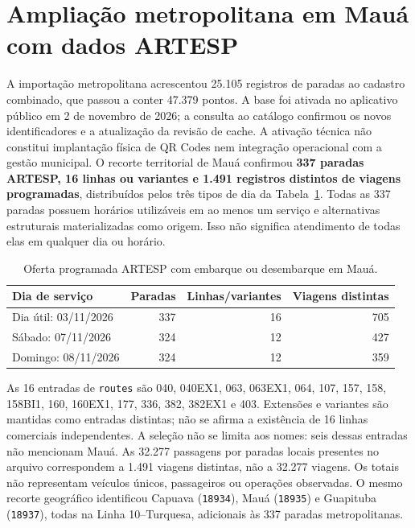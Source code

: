 \section{Ampliação metropolitana em Mauá com dados ARTESP}
\label{sec:artesp-maua}
A importação metropolitana acrescentou 25.105 registros de paradas ao cadastro combinado, que passou a conter 47.379 pontos. A base foi ativada no aplicativo público em 2 de novembro de 2026; a consulta ao catálogo confirmou os novos identificadores e a atualização da revisão de cache. A ativação técnica não constitui implantação física de QR Codes nem integração operacional com a gestão municipal. O recorte territorial de Mauá confirmou \textbf{337 paradas ARTESP, 16 linhas ou variantes e 1.491 registros distintos de viagens programadas}, distribuídos pelos três tipos de dia da Tabela~\ref{tab:artesp-maua-dias}. Todas as 337 paradas possuem horários utilizáveis em ao menos um serviço e alternativas estruturais materializadas como origem. Isso não significa atendimento de todas elas em qualquer dia ou horário.

\begin{table}[H]\centering\small
\caption{Oferta programada ARTESP com embarque ou desembarque em Mauá.}\label{tab:artesp-maua-dias}
\begin{tabular}{p{4.7cm}rrr}\hline
Dia de serviço & Paradas & Linhas/variantes & Viagens distintas\\\hline
Dia útil: 03/11/2026 & 337 & 16 & 705\\
Sábado: 07/11/2026 & 324 & 12 & 427\\
Domingo: 08/11/2026 & 324 & 12 & 359\\\hline
\end{tabular}
\end{table}

As 16 entradas de \texttt{routes} são 040, 040EX1, 063, 063EX1, 064, 107, 157, 158, 158BI1, 160, 160EX1, 177, 336, 382, 382EX1 e 403. Extensões e variantes são mantidas como entradas distintas; não se afirma a existência de 16 linhas comerciais independentes. A seleção não se limita aos nomes: seis dessas entradas não mencionam Mauá. As 32.277 passagens por paradas locais presentes no arquivo correspondem a 1.491 viagens distintas, não a 32.277 viagens. Os totais não representam veículos únicos, passageiros ou operações observadas. O mesmo recorte geográfico identificou Capuava (\texttt{18934}), Mauá (\texttt{18935}) e Guapituba (\texttt{18937}), todas na Linha 10--Turquesa, adicionais às 337 paradas metropolitanas.

